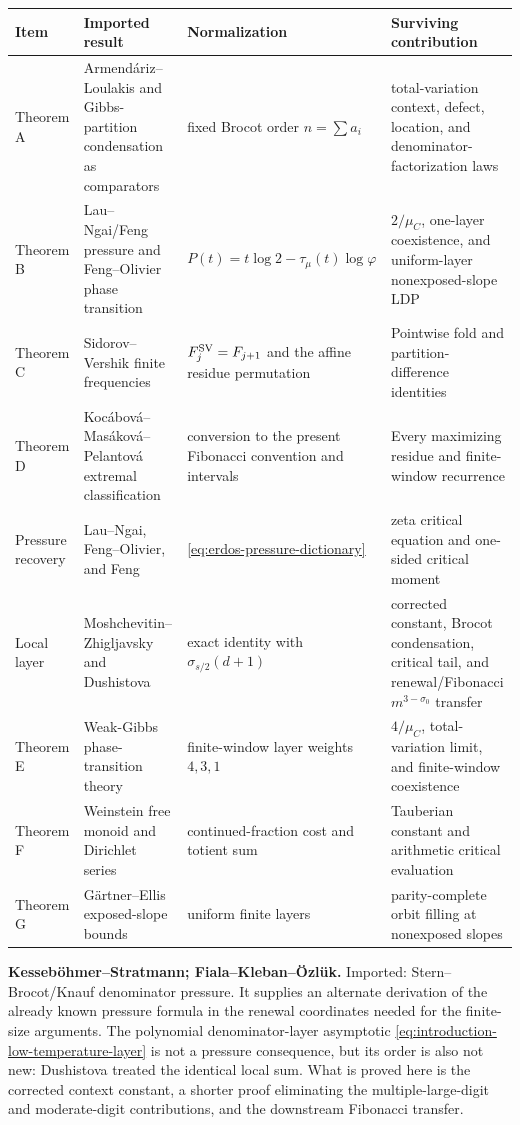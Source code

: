 \begin{center}
\small
\setlength{\tabcolsep}{2pt}
\begin{tabular}{@{}p{}p{}p{}p{}@{}}
\toprule
Item & Imported result & Normalization & Surviving contribution\\
\midrule
Theorem A & Armend\'ariz--Loulakis and Gibbs-partition condensation as
comparators & fixed Brocot order \(n=\sum a_i\) & total-variation context,
defect, location, and denominator-factorization laws\\
Theorem B & Lau--Ngai/Feng pressure and Feng--Olivier phase transition &
\(P(t)=t\log2-\tau_\mu(t)\log\varphi\) & \(2/\mu_C\), one-layer coexistence,
and uniform-layer nonexposed-slope LDP\\
Theorem C & Sidorov--Vershik finite frequencies &
\(F_j^{\rm SV}=F_{j+1}\) and the affine residue permutation & Pointwise fold
and partition-difference identities\\
Theorem D & Koc\'abov\'a--Mas\'akov\'a--Pelantov\'a extremal classification &
conversion to the present Fibonacci convention and intervals & Every
maximizing residue and finite-window recurrence\\
Pressure recovery & Lau--Ngai, Feng--Olivier, and Feng &
\eqref{eq:erdos-pressure-dictionary} & zeta critical equation and one-sided
critical moment\\
Local layer & Moshchevitin--Zhigljavsky and Dushistova & exact identity with
\(\sigma_{s/2}(d+1)\) & corrected constant, Brocot condensation, critical
tail, and renewal/Fibonacci \(m^{3-\sigma_0}\) transfer\\
Theorem E & Weak-Gibbs phase-transition theory & finite-window layer weights
\(4,3,1\) & \(4/\mu_C\), total-variation limit, and finite-window coexistence\\
Theorem F & Weinstein free monoid and Dirichlet series & continued-fraction
cost and totient sum & Tauberian constant and arithmetic critical evaluation\\
Theorem G & G\"artner--Ellis exposed-slope bounds & uniform finite layers &
parity-complete orbit filling at nonexposed slopes\\
\bottomrule
\end{tabular}
\end{center}

\noindent\textbf{Kesseb\"ohmer--Stratmann; Fiala--Kleban--\"Ozl\"uk.}
Imported: Stern--Brocot/Knauf denominator pressure.  It supplies an alternate
derivation of the already known pressure formula in the renewal coordinates
needed for the finite-size arguments.  The polynomial denominator-layer
asymptotic \eqref{eq:introduction-low-temperature-layer} is not a pressure
consequence, but its order is also not new: Dushistova treated the identical
local sum.  What is proved here is the corrected context constant, a shorter
proof eliminating the multiple-large-digit and moderate-digit contributions,
and the downstream Fibonacci transfer.

